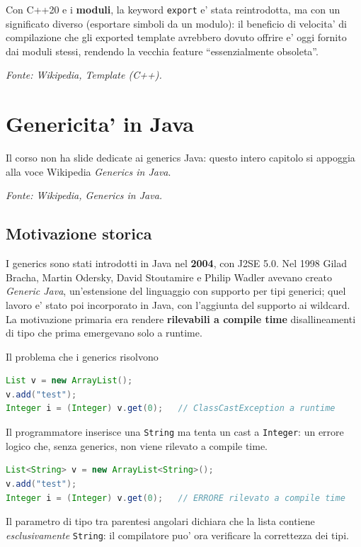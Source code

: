 \documentclass{report}
\newcommand{\code}[1]{\texttt{\small #1}}
\newcommand{\fontewiki}[1][Template (C++)]{{\footnotesize\itshape\color{gray} Fonte: Wikipedia, \emph{#1}.\par}}
\begin{document}
Con C++20 e i \textbf{moduli}, la keyword \code{export} e' stata
reintrodotta, ma con un significato diverso (esportare simboli da un modulo):
il beneficio di velocita' di compilazione che gli exported template
avrebbero dovuto offrire e' oggi fornito dai moduli stessi, rendendo la
vecchia feature ``essenzialmente obsoleta''.

\fontewiki

\chapter{Genericita' in Java}\label{ch:java}

Il corso non ha slide dedicate ai generics Java: questo intero capitolo si
appoggia alla voce Wikipedia \emph{Generics in Java}.

\fontewiki[Generics in Java]

\section{Motivazione storica}

I generics sono stati introdotti in Java nel \textbf{2004}, con J2SE 5.0. Nel
1998 Gilad Bracha, Martin Odersky, David Stoutamire e Philip Wadler avevano
creato \emph{Generic Java}, un'estensione del linguaggio con supporto per
tipi generici; quel lavoro e' stato poi incorporato in Java, con l'aggiunta
del supporto ai wildcard. La motivazione primaria era rendere
\textbf{rilevabili a compile time} disallineamenti di tipo che prima
emergevano solo a runtime.

\begin{Example}{Il problema che i generics risolvono}{}
\begin{lstlisting}[language=Java]
List v = new ArrayList();
v.add("test");
Integer i = (Integer) v.get(0);   // ClassCastException a runtime
\end{lstlisting}
Il programmatore inserisce una \code{String} ma tenta un cast a
\code{Integer}: un errore logico che, senza generics, non viene rilevato
a compile time.
\begin{lstlisting}[language=Java]
List<String> v = new ArrayList<String>();
v.add("test");
Integer i = (Integer) v.get(0);   // ERRORE rilevato a compile time
\end{lstlisting}
Il parametro di tipo tra parentesi angolari dichiara che la lista contiene
\emph{esclusivamente} \code{String}: il compilatore puo' ora verificare la
correttezza dei tipi.
\end{Example}
\end{document}
